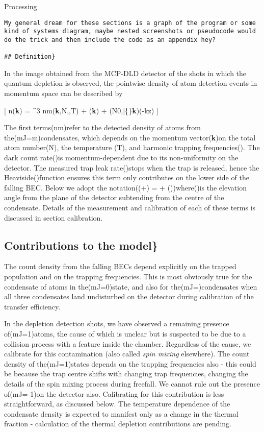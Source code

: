 Processing

\begin{verbatim}
My general dream for these sections is a graph of the program or some kind of systems diagram, maybe nested screenshots or pseudocode would do the trick and then include the code as an appendix hey?

## Definition}
\end{verbatim}

In the image obtained from the MCP-DLD detector of the shots in which
the quantum depletion is observed, the pointwise density of atom
detection events in momentum space can be described by

{[} n(\textbf{k}) = \^{}3 nm(\textbf{k},N,,T) +
\delta(\textbf{k}) + \lambda(N0,\bar\{\omega\}\textbf{k})\Theta(-kz) {]}

The first terms(nm)refer to the detected density of atoms from
the(mJ=m)condensates, which depends on the momentum vector(\textbf{k})on
the total atom number(N), the temperature (T), and harmonic trapping
frequencies(). The dark count rate(\delta)is
momentum-dependent due to its non-uniformity on the detector. The
measured trap leak rate(\lambda)stops when the trap is released, hence
the Heaviside(\Theta)function ensures this term only contributes on the
lower side of the falling BEC. Below we adopt the
notation((\delta+\lambda) = \delta +
\lambda\Theta(\theta))where(\theta)is the elevation angle from the plane
of the detector subtending from the centre of the condensate. Details of
the measurement and calibration of each of these terms is discussed in
section calibration.

\hypertarget{contributions-to-the-model}{%
\subsection{Contributions to the
model\}}\label{contributions-to-the-model}}

The count density from the falling BECs depend explicitly on the trapped
population and on the trapping frequencies. This is most obviously true
for the condensate of atoms in the(mJ=0)state, and also for
the(mJ=)condensates when all three condensates land undisturbed on
the detector during calibration of the transfer efficiency.

In the depletion detection shots, we have observed a remaining presence
of(mJ=1)atoms, the cause of which is unclear but is suspected to be due
to a collision process with a feature inside the chamber. Regardless of
the cause, we calibrate for this contamination (also called
\textit{spin mixing} elsewhere). The count density of the(mJ=1)states
depends on the trapping frequencies also - this could be because the
trap centre shifts with changing trap frequencies, changing the details
of the spin mixing process during freefall. We cannot rule out the
presence of(mJ=-1)on the detector also. Calibrating for this
contribution is less straightforward, as discussed below. The
temperature dependence of the condensate density is expected to manifest
only as a change in the thermal fraction - calculation of the thermal
depletion contributions are pending.

